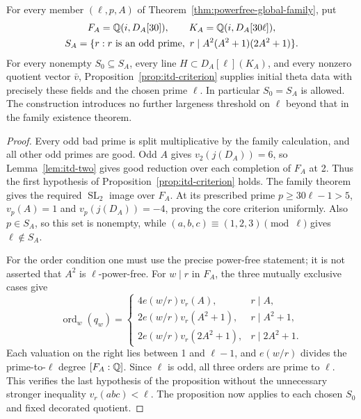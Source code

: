 \begin{corollary}
\label{cor:itd-powerfree-family}
For every member $(\ell,p,A)$ of
Theorem~\ref{thm:powerfree-global-family}, put
\[
 \begin{gathered}
  F_A=\mathbb Q(i,D_A[30]),\qquad K_A=\mathbb Q(i,D_A[30\ell]),\\
  S_A=\{r:r\text{ is an odd prime},\ r\mid A^2(A^2+1)(2A^2+1)\}.
 \end{gathered}
\]
For every nonempty $S_0\subseteq S_A$, every line
$H\subset D_A[\ell](K_A)$, and every nonzero quotient vector
$\bar v$, Proposition~\ref{prop:itd-criterion} supplies initial
theta data with precisely these fields and the chosen prime
$\ell$. In particular $S_0=S_A$ is allowed.
The construction introduces no further largeness threshold on
$\ell$ beyond that in the family existence theorem.
\end{corollary}

\begin{proof}
Every odd bad prime is split multiplicative by the family
calculation, and all other odd primes are good. Odd $A$ gives
$v_2(j(D_A))=6$, so Lemma~\ref{lem:itd-two} gives good reduction
over each completion of $F_A$ at 2. Thus the first hypothesis
of Proposition~\ref{prop:itd-criterion} holds. The family
theorem gives the required $\operatorname{SL}_2$ image over
$F_A$. At its prescribed prime $p\ge30\ell-1>5$,
$v_p(A)=1$ and $v_p(j(D_A))=-4$, proving the core criterion
uniformly. Also $p\in S_A$, so this set is nonempty, while
$(a,b,c)\equiv(1,2,3)\pmod\ell$ gives $\ell\notin S_A$.

For the order condition one must use the precise power-free
statement; it is not asserted that $A^2$ is $\ell$-power-free.
For $w\mid r$ in $F_A$, the three mutually exclusive cases give
\begin{equation}\label{eq:itd-family-orders}
 \operatorname{ord}_w(q_w)=
 \begin{cases}
  4e(w/r)v_r(A),&r\mid A,\\
  2e(w/r)v_r(A^2+1),&r\mid A^2+1,\\
  2e(w/r)v_r(2A^2+1),&r\mid2A^2+1.
 \end{cases}
\end{equation}
Each valuation on the right lies between 1 and $\ell-1$,
and $e(w/r)$ divides the prime-to-$\ell$ degree $[F_A:\mathbb Q]$.
Since $\ell$ is odd, all three orders are prime to $\ell$.
This verifies the last hypothesis of the proposition without
the unnecessary stronger inequality $v_r(abc)<\ell$.
The proposition now applies to each chosen $S_0$ and fixed
decorated quotient.
\end{proof}

